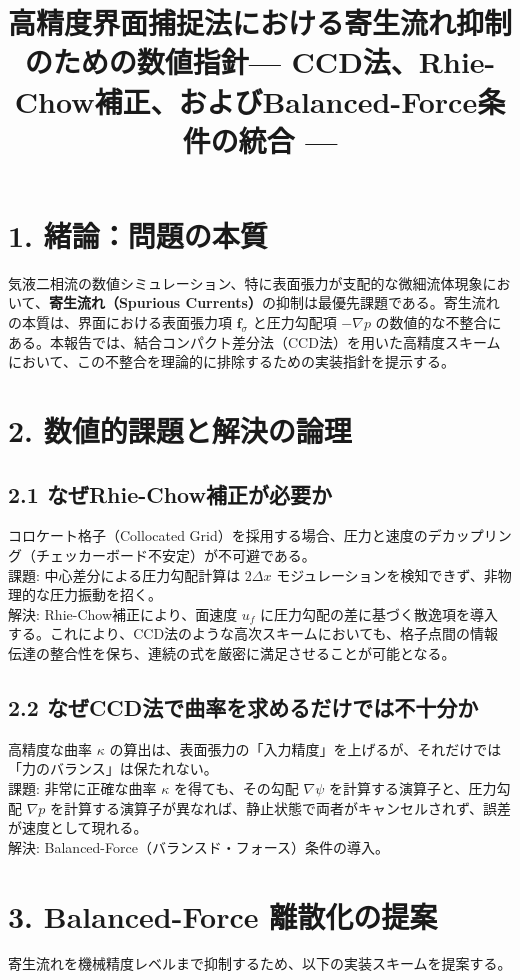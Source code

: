 \documentclass[12pt, a4paper, titlepage]{article}
\title{高精度界面捕捉法における寄生流れ抑制のための数値指針— CCD法、Rhie-Chow補正、およびBalanced-Force条件の統合 —}
\author{}
\date{}
\begin{document}
\maketitle

\section*{1. 緒論：問題の本質}
気液二相流の数値シミュレーション、特に表面張力が支配的な微細流体現象において、\textbf{寄生流れ（Spurious Currents）}の抑制は最優先課題である。寄生流れの本質は、界面における表面張力項 $\mathbf{f}_\sigma$ と圧力勾配項 $-\nabla p$ の数値的な不整合にある。本報告では、結合コンパクト差分法（CCD法）を用いた高精度スキームにおいて、この不整合を理論的に排除するための実装指針を提示する。

\section*{2. 数値的課題と解決の論理}

\subsection*{2.1 なぜRhie-Chow補正が必要か}
コロケート格子（Collocated Grid）を採用する場合、圧力と速度のデカップリング（チェッカーボード不安定）が不可避である。\\
課題: 中心差分による圧力勾配計算は $2\Delta x$ モジュレーションを検知できず、非物理的な圧力振動を招く。\\
解決: Rhie-Chow補正により、面速度 $u_f$ に圧力勾配の差に基づく散逸項を導入する。これにより、CCD法のような高次スキームにおいても、格子点間の情報伝達の整合性を保ち、連続の式を厳密に満足させることが可能となる。

\subsection*{2.2 なぜCCD法で曲率を求めるだけでは不十分か}
高精度な曲率 $\kappa$ の算出は、表面張力の「入力精度」を上げるが、それだけでは「力のバランス」は保たれない。\\
課題: 非常に正確な曲率 $\kappa$ を得ても、その勾配 $\nabla \psi$ を計算する演算子と、圧力勾配 $\nabla p$ を計算する演算子が異なれば、静止状態で両者がキャンセルされず、誤差が速度として現れる。\\
解決: Balanced-Force（バランスド・フォース）条件の導入。

\section*{3. Balanced-Force 離散化の提案}
寄生流れを機械精度レベルまで抑制するため、以下の実装スキームを提案する。
\end{document}
